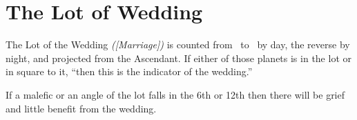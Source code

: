 \section{The Lot of Wedding}

The Lot of the Wedding \textsl{([Marriage])} is counted from \Saturn\, to \Venus\, by day, the reverse by night, and projected from the Ascendant. If either of those planets is in the lot or in square to it, ``then this is the indicator of the wedding.''

If a malefic or an angle of the lot falls in the 6th or 12th then there will be grief and little benefit from the wedding.